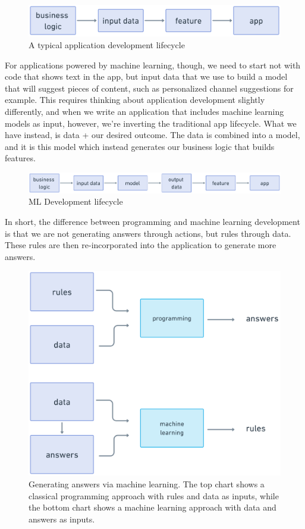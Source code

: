 \documentclass[11pt, table]{diazessay} %
\begin{document}
\begin{sloppypar}
\begin{figure}[H]
\centering
\includegraphics[width=.75\textwidth]{figures/app_flow.png}
\caption{A typical application development lifecycle}
\end{figure}

For applications powered by machine learning, though, we need to start not with code that shows text in the app, but input data that we use to build a model that will suggest pieces of content, such as personalized channel suggestions for example. This requires thinking about application development slightly differently, and when we write an application that includes machine learning models as input, however, we’re inverting the traditional app lifecycle. What we have instead, is data + our desired outcome. The data is combined into a model, and it is this model which instead generates our business logic that builds features.

\begin{figure}[H]
\centering
\includegraphics[width=.95\textwidth]{figures/ml-flow.png}
\caption{ML Development lifecycle}
\end{figure}

In short, the difference between programming and machine learning development is that we are not generating answers through actions, but rules through data. These rules are then re-incorporated into the application to generate more answers.

\begin{figure}[H]
\centering
\includegraphics[width=.75\textwidth]{figures/rules_ml.png}
\caption{Generating answers via machine learning. The top chart shows a classical programming approach with rules and data as inputs, while the bottom chart shows a machine learning approach with data and answers as inputs. \citep{chollet2021deep}}
\end{figure}


\end{sloppypar}
\end{document}
